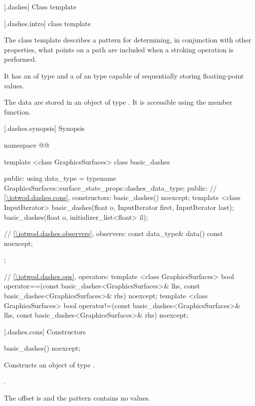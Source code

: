 
 [\iotwod.dashes] {Class template }

 [\iotwod.dashes.intro] { class template}

\pnum
{}%
The class template  describes a pattern for determining, in conjunction with other properties, what points on a path are included when a stroking operation is performed.

\pnum
It has an  of type  and a  of an \unspec type capable of sequentially storing floating-point values.

\pnum
The data are stored in an object of type . It is accessible using the  member function.

 [\iotwod.dashes.synopsis] {Synopsis}

\begin{codeblock}
namespace @\fullnamespace{}@ {
  template <class GraphicsSurfaces>
  class basic_dashes {
  public:
  using data_type = 
    typename GraphicsSurfaces::surface_state_props::dashes_data_type;
  public:
    // \ref{\iotwod.dashes.cons}, constructors:
    basic_dashes() noexcept;
    template <class InputIterator>
    basic_dashes(float o, InputIterator first, InputIterator last);
    basic_dashes(float o, initializer_list<float> il);

    // \ref{\iotwod.dashes.observers}, observers:
    const data_type& data() const noexcept;
  };

  // \ref{\iotwod.dashes.ops}, operators:
  template <class GraphicsSurfaces>
  bool operator==(const basic_dashes<GraphicsSurfaces>& lhs,
    const basic_dashes<GraphicsSurfaces>& rhs) noexcept;
  template <class GraphicsSurfaces>
  bool operator!=(const basic_dashes<GraphicsSurfaces>& lhs,
    const basic_dashes<GraphicsSurfaces>& rhs) noexcept;
}
\end{codeblock}

 [\iotwod.dashes.cons] {Constructors}

%
\begin{itemdecl}
basic_dashes() noexcept;
\end{itemdecl}
\begin{itemdescr}
\pnum
\effects
Constructs an object of type .

\pnum
\postconditions
{}.

\pnum
\remarks
The offset is  and the pattern contains no values.
\end{itemdescr}

